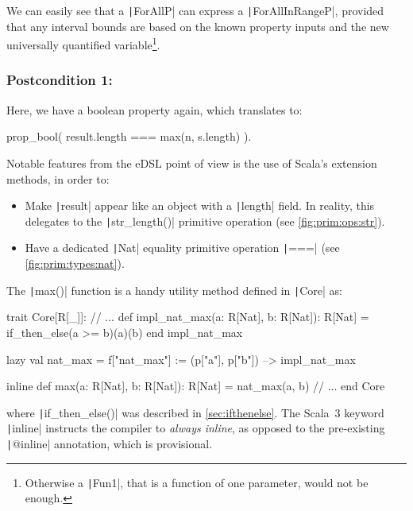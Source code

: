 \documentclass[11pt]{article}
\newcommand{\Scala}[1]{\texttt|#1|}
\newcommand{\ScalaI}[1]{\texttt|#1|}
\begin{document}
\noindent We can easily see that a \ScalaI{ForAllP} can express a 
\ScalaI{ForAllInRangeP}, provided that any interval bounds are based on the 
known property inputs and the new universally quantified 
variable\footnote{Otherwise a \ScalaI{Fun1}, that is a function of one 
parameter, would not be enough.}.

\subsubsection*{Postcondition 1: \leftpadposta}

\noindent Here, we have a boolean property again, which translates to:

\begin{ScalaBlockSimple}
prop_bool( result.length === max(n, s.length) ).
\end{ScalaBlockSimple}

\noindent Notable features from the eDSL point of view is the use of Scala's extension methods, in order to:

\begin{itemize}
  \item Make \ScalaI{result} appear like an object with a \ScalaI{length} 
  field. In reality, this delegates to the \ScalaI{str_length()} primitive 
  operation (see \autoref{fig:prim:ops:str}).
  
  \item Have a dedicated \Scala{Nat} equality primitive operation 
  \ScalaI{===} (see \autoref{fig:prim:types:nat}).
\end{itemize}

\noindent The \ScalaI{max()} function is a handy utility method defined in 
\ScalaI{Core} as:

\begin{ScalaBlockSimple}
trait Core[R[_]]:
  // ...
  def impl_nat_max(a: R[Nat], b: R[Nat]): R[Nat] =
    if_then_else(a >= b)(a)(b)
  end impl_nat_max

  lazy val nat_max = f["nat_max"] := (p["a"], p["b"]) --> impl_nat_max
  
  inline def max(a: R[Nat], b: R[Nat]): R[Nat] = nat_max(a, b)
  // ...
end Core
\end{ScalaBlockSimple} 

\noindent where \ScalaI{if_then_else()} was described in 
\autoref{sec:ifthenelse}. The Scala~3 keyword \ScalaI{inline} instructs the 
compiler to \textit{always inline}, as opposed to the pre-existing 
\ScalaI{@inline} annotation, which is provisional.
\end{document}
